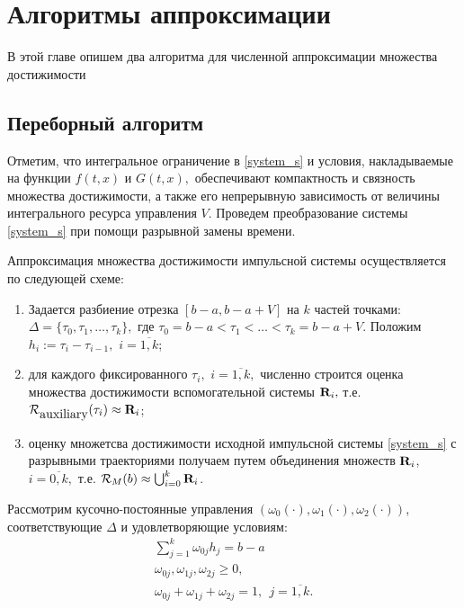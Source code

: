 \chapter{Алгоритмы аппроксимации}
\label{ch:algrhtms}


В этой главе опишем два алгоритма для численной аппроксимации
множества достижимости

\section{Переборный алгоритм}
\label{sec:simple_alg}

Отметим, что интегральное ограничение в
\eqref{system_s} и условия, накладываемые на функции $f(t,x)$ и $G(t,x),$
обеспечивают компактность и связность множества достижимости, а
также его непрерывную зависимость от величины интегрального
ресурса управления $V$. Проведем преобразование системы
\eqref{system_s} при помощи разрывной замены времени. 

Аппроксимация множества достижимости импульсной системы осуществляется по
следующей схеме:
\begin{enumerate}
\item Задается разбиение отрезка $[b-a,b-a+V]$ на $k$ частей точками:
  $ \Delta=\big\{ \tau_{0}, \tau_{1}, \ldots, \tau_{k} \big\}, $ где
  $\tau_{0}=b-a< \tau_{1}< \ldots < \tau_{k}=b-a+V$. Положим
  $h_i:=\tau_{i}-\tau_{i-1},$ $i=\overline{1,k}$;
\item для каждого фиксированного $\tau_{i},$ $i=\overline{1,k},$
  численно строится оценка множества достижимости вспомогательной
  системы $\mbox{\bf R}_i ,$ т.е.
  ${\mathcal R}_{\mbox{\rm auxiliary}}(\tau_{i}) \approx \mbox{\bf
    R}_i$;
\item оценку множетсва достижимости исходной импульсной системы \eqref{system_s} с
  разрывными траекториями получаем путем объединения множеств
  $\mbox{\bf R}_i$, $i=\overline{0,k},$ т.е.
  $ {\mathcal R}_M(b)\approx \bigcup_{i=0}^k \mbox{\bf R}_i$.
\end{enumerate}


Рассмотрим кусочно-постоянные управления
$(\omega_0(\cdot),\omega_1(\cdot),\omega_2(\cdot))$, соответствующие
$\Delta$ и удовлетворяющие условиям:
\begin{equation*}
  \begin{array}{l}
    \sum_{j=1}^k \omega_{0j}h_j=b-a\\
    \omega_{0j}, \omega_{1j}, \omega_{2j} \geq 0,\\ 
    \omega_{0j}+ \omega_{1j}+ \omega_{2j} =1, \ \ j=\overline{1,k}.
  \end{array}
\end{equation*}

